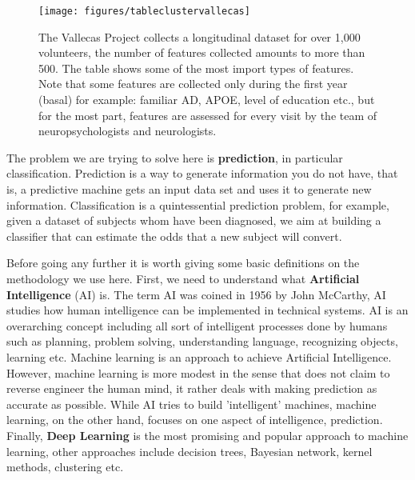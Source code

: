 \documentclass[11pt]{article}
\theoremstyle{definition}
\theoremstyle{remark}
\begin{document}
\begin{figure}[h]
        \centering
        \texttt{[image: figures/tableclustervallecas]}
        \caption{The Vallecas Project collects a longitudinal dataset for over 1,000 volunteers, the number of features collected amounts to more than 500. The table shows some of the most import types of features. Note that some features are collected only during the first year (basal) for example: familiar AD, APOE, level of education etc., but for the most part, features are assessed for every visit by the team of neuropsychologists and neurologists.} \label{fig:tableclustervallecas}
\end{figure}

The problem we are trying to solve here is \textbf{prediction}, in particular classification. 
Prediction is a way to generate information you do not have, that is, a predictive machine gets an input data set and uses it to generate new information. Classification is a quintessential prediction problem, for example, given a dataset of subjects whom have been diagnosed, we aim at building a classifier that can estimate the odds that a new subject will convert. 

Before going any further it is worth giving some basic definitions on the methodology we use here. First, we need to understand what \textbf{Artificial Intelligence} (AI) is. The term AI was coined in 1956 by John McCarthy, AI studies how human intelligence can be implemented in technical systems. AI is an overarching concept including all sort of intelligent processes done by humans such as planning, problem solving, understanding language, recognizing objects, learning etc. 
Machine learning is an approach to achieve Artificial Intelligence. However, machine learning is more modest in the sense that does not claim to reverse engineer the human mind, it rather deals with making prediction as accurate as possible. While AI tries to build 'intelligent' machines, machine learning, on the other hand, focuses on one aspect of intelligence, prediction.
Finally, \textbf{Deep Learning} is the most promising and popular approach to machine learning, other approaches include decision trees, Bayesian network, kernel methods, clustering etc.
  
\end{document}
